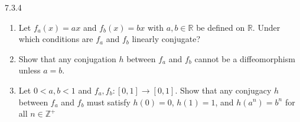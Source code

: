 \begin{problem}{7.3.4}
  \begin{enumerate}
    \item Let $f_a(x) = ax$ and $f_b(x) = bx$ with $a,b \in \mathbb{R}$ be defined on $\mathbb{R}$.
      Under which conditions are $f_a$ and $f_b$ linearly conjugate?
    \item Show that any conjugation $h$ between $f_a$ and $f_b$ cannot be a diffeomorphism
      unless $a=b$.
    \item Let $0 < a, b < 1$ and $f_a, f_b: [0, 1] \to [0, 1]$. Show that any conjugacy $h$ between
      $f_a$ and $f_b$ must satisfy $h(0) = 0$, $h(1) = 1$, and $h(a^n) = b^n$ for all $n \in \mathbb{Z}^+$
  \end{enumerate}
\end{problem}

